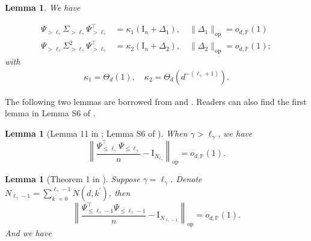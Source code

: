 \documentclass{article}
\theoremstyle{plain}
\newtheorem{lemma}[theorem]{Lemma}
\theoremstyle{definition}
\theoremstyle{remark}
\begin{document}
\begin{appendix}
\begin{lemma}\label{lemma psi psi top}
   We have

    \begin{equation}\label{eq k ge l in lemma}
    \begin{aligned}
        \Psi_{>\ell_{\gamma}} \Sigma_{>\ell_{\gamma}} \Psi_{>\ell_{\gamma}}^{\top} &= \kappa_1 \left(\mathrm{I}_{n} + \Delta_{1}\right), \quad \|\Delta_{1}\|_{\mathrm{op}} = o_{d, \mathbb{P}}(1)\\
        \Psi_{>\ell_{\gamma}} \Sigma_{>\ell_{\gamma}}^{2} \Psi_{>\ell_{\gamma}}^{\top} &= \kappa_2 \left(\mathrm{I}_{n} + \Delta_{2}\right), \quad \|\Delta_{2}\|_{\mathrm{op}} = o_{d, \mathbb{P}}(1);
    \end{aligned}
    \end{equation}
    with
    \begin{align*}
    \kappa_{1} = \Theta_{d}(1), \quad \kappa_{2} = \Theta_{d}\left( d^{-(\ell_{\gamma}+1)} \right).
\end{align*}
\end{lemma}

The following two lemmas are borrowed from \cite{ghorbani2021linearized} and \cite{xiao2022precise}. Readers can also find the first lemma in Lemma S6 of \cite{zhang2024phase}.


 



\begin{lemma}[Lemma 11 in \cite{ghorbani2021linearized}; Lemma S6 of \cite{zhang2024phase}]
\label{lemma psi top psi}
When $\gamma > \ell_{\gamma}$, we have
    \begin{displaymath}
         \left\| \frac{\Psi_{\leq \ell_{\gamma}}^{\top} \Psi_{\leq \ell_{\gamma}} }{n} - \mathrm{I}_{N_{\ell_{\gamma}}} \right\|_{\mathrm{op}} = o_{d, \mathbb{P}}(1).
    \end{displaymath}
\end{lemma}


\begin{lemma}[Theorem 1 in  \cite{xiao2022precise}]\label{lemma psi top psi_int}
Suppose $\gamma = \ell_{\gamma}$. Denote $N_{\ell_{\gamma}-1} = \sum_{k^{\prime}=0}^{\ell_{\gamma}-1} N(d,k^{\prime})$, then
\begin{equation}\label{eqn_lemma psi top psi_int_1}
    \left\| \frac{\Psi_{\leq \ell_{\gamma}-1}^{\top} \Psi_{\leq \ell_{\gamma}-1} }{n} - \mathrm{I}_{N_{\ell_{\gamma}-1}} \right\|_{\mathrm{op}} = o_{d, \mathbb{P}}(1).
\end{equation}
    And we have
    

\end{lemma}
\end{appendix}
\end{document}
